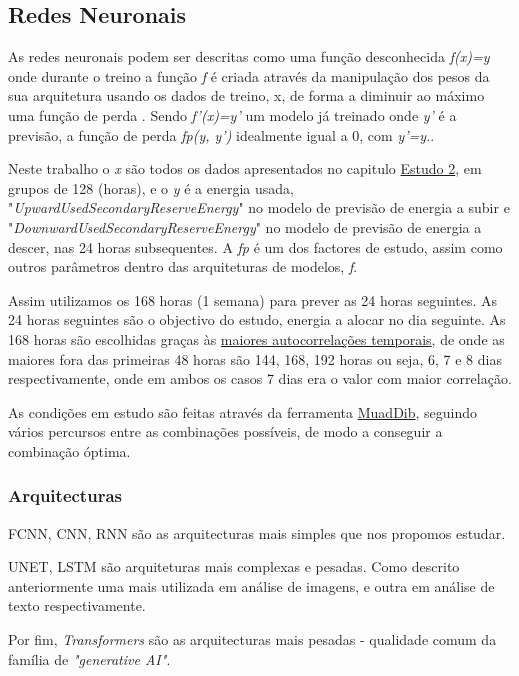 \subsection{Redes Neuronais}

As redes neuronais podem ser descritas como uma função desconhecida \textit{f(x)=y} onde durante o treino a função \textit{f} é criada através da manipulação dos pesos da sua arquitetura usando os dados de treino, x, de forma a diminuir ao máximo uma função de perda . Sendo \textit{f'(x)=y'} um modelo já treinado onde \textit{y'} é a previsão, a função de perda \textit{fp(y, y')} idealmente igual a 0, com \textit{y'=y.}.\par
Neste trabalho o \textit{x} são todos os dados apresentados no capitulo \hyperref[ch:estudo_2]{Estudo 2}, em grupos de 128 (horas), e o \textit{y} é a energia usada, "\textit{UpwardUsedSecondaryReserveEnergy}" no modelo de previsão de energia a subir e "\textit{DownwardUsedSecondaryReserveEnergy}" no modelo de previsão de energia a descer, nas 24 horas subsequentes. A \textit{fp} é um dos factores de estudo, assim como outros parâmetros dentro das arquiteturas de modelos, \textit{f}.\par
Assim utilizamos os 168 horas (1 semana) para prever as 24 horas seguintes. As 24 horas seguintes são o objectivo do estudo, energia a alocar no dia seguinte. As 168 horas são escolhidas graças às \hyperref[tab:tempcorr]{maiores autocorrelações temporais}, de onde as maiores fora das primeiras 48 horas são 144, 168, 192 horas ou seja, 6, 7 e 8 dias respectivamente, onde em ambos os casos 7 dias era o valor com maior correlação.\par
As condições em estudo são feitas através da ferramenta \hyperref[se:muaddib]{MuadDib}, seguindo vários percursos entre as combinações possíveis, de modo a conseguir a combinação óptima.\par

\subsubsection{Arquitecturas}

\gls{FCNN}, \gls{CNN}, RNN são as arquitecturas mais simples que nos propomos estudar.\par
UNET, \gls{LSTM} são arquiteturas mais complexas e pesadas. Como descrito anteriormente uma mais utilizada em análise de imagens, e outra em análise de texto respectivamente.\par 
Por fim, \textit{Transformers} são as arquitecturas mais pesadas - qualidade comum da família de \textit{"generative AI"}.

